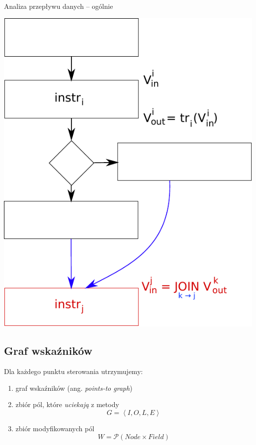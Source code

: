 \documentclass{beamer}
\begin{document}
\begin{frame}{Analiza przepływu danych -- ogólnie}
\begin{center}
  \includegraphics[scale=0.55]{img/dataflow-2.pdf}  
\end{center}
\end{frame}

\subsection{Graf wskaźników}

\begin{frame}
  Dla każdego punktu sterowania utrzymujemy:
  \begin{enumerate}
  \item<1-> graf wskaźników (ang. \emph{points-to graph})
  \item<1-> zbiór pól, które \emph{uciekają} z metody
      $$G = \left<I, O, L, E\right>$$
  \item<2-> zbiór modyfikowanych pól
    $$W = \mathcal{P}\left(Node \times Field\right)$$
  \end{enumerate}
\end{frame}
\end{document}
